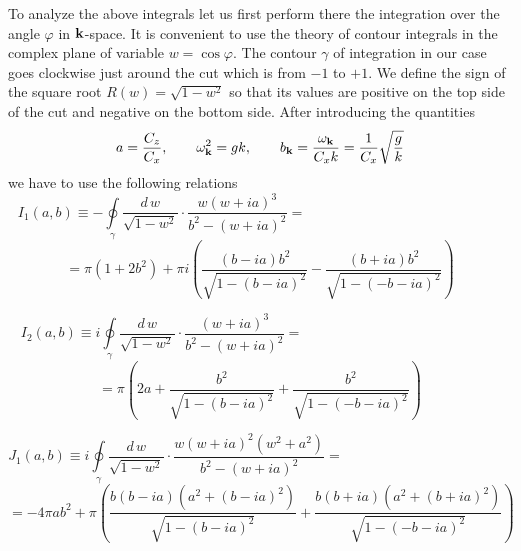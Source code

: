 To analyze the above integrals let us first perform there the integration over 
the angle $\varphi$ in ${\bf k}$-space. 
It is convenient to use  the theory of contour integrals in the 
complex plane of variable $w=\cos\varphi$. The contour $\gamma$ of integration 
in our case goes clockwise just around the cut which is from $-1$ to $+1$. 
We define the sign of the square root $R(w)=\sqrt{1-w^2}$ so 
that its values are positive on 
the top side of the cut and negative on the bottom side. 
After introducing the quantities
\begin{equation}
a=\frac{C_z}{C_x},\qquad \omega_{\bf k}^2=gk,\qquad 
b_{\bf k}=\frac{\omega_{\bf k}}{C_x k}=\frac{1}{C_x}\sqrt{\frac{g}{k}}
\end{equation}
we have to use the following relations
$$
I_1(a,b)\equiv -\oint\limits_\gamma\frac{d\,w}{\sqrt{1-w^2}}\cdot
\frac{w(w+ia)^3}{b^2-(w+ia)^2}=\qquad\qquad\qquad\qquad\qquad\qquad\qquad
$$
\begin{equation}
=\pi(1+2b^2)+\pi i
\left(\frac{(b-ia)b^2}{\sqrt{1-(b-ia)^2}}-\frac{(b+ia)b^2}{\sqrt{1-(-b-ia)^2}}
\right)
\end{equation}

$$
I_2(a,b)\equiv i\oint\limits_\gamma\frac{d\,w}{\sqrt{1-w^2}}\cdot
\frac{(w+ia)^3}{b^2-(w+ia)^2}=\qquad\qquad\qquad\qquad\qquad\qquad\qquad
$$
\begin{equation}
=\pi\left(2a+\frac{b^2}{\sqrt{1-(b-ia)^2}}+\frac{b^2}{\sqrt{1-(-b-ia)^2}}
\right)
\end{equation}

$$
J_1(a,b)\equiv i\oint\limits_\gamma\frac{d\,w}{\sqrt{1-w^2}}\cdot
\frac{w(w+ia)^2(w^2+a^2)}{b^2-(w+ia)^2}=
\qquad\qquad\qquad\qquad\qquad\qquad
$$
\begin{equation}
=-4\pi ab^2+\pi\left(
\frac{b(b-ia)(a^2+(b-ia)^2)}{\sqrt{1-(b-ia)^2}}+
\frac{b(b+ia)(a^2+(b+ia)^2)}{\sqrt{1-(-b-ia)^2}}
\right)
\end{equation}

